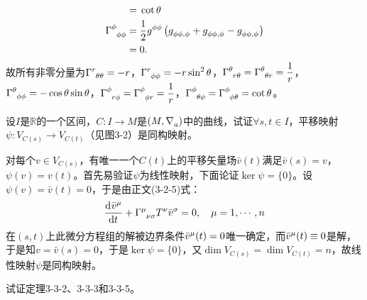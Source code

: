 \begin{xiti}
\begin{jie}
\begin{align*}
		=&\; \cot\theta\\
		\ChristoffelSymbol{\phi}{\phi}{\phi}=&\; \christoffelSymbol{\phi}{\phi}{\phi}{\phi}\\
		=&\; 0.
		\end{align*}
		故所有非零分量为$\displaystyle \ChristoffelSymbol{r}{\theta}{\theta}=-r $，$\displaystyle \ChristoffelSymbol{r}{\phi}{\phi}=-r \sin^2 \theta $，$\displaystyle \ChristoffelSymbol{\theta}{r}{\theta} = \ChristoffelSymbol{\theta}{\theta}{r} = \frac{1}{r} $，$\displaystyle \ChristoffelSymbol{\theta}{\phi}{\phi} = - \cos \theta \sin \theta $，$\displaystyle \ChristoffelSymbol{\phi}{r}{\phi} = \ChristoffelSymbol{\phi}{\phi}{r} = \frac{1}{r} $，$\displaystyle \ChristoffelSymbol{\phi}{\theta}{\phi} = \ChristoffelSymbol{\phi}{\phi}{\theta}=\cot\theta $。
	\end{jie}

	\item 设$I$是$\mathbb{R}$的一个区间，$C\colon I\rightarrow M $是$\left( M,\Nabla{a} \right)$中的曲线，试证$\forall s,t\in I $，平移映射$\psi\colon V_{C(s)}\rightarrow V_{C(t)} $（见图3-2）是同构映射。

	\begin{zm}
		对每个$v\in V_{C(s)}$，有唯一一个$C(t)$上的平移矢量场$\bar{v}(t)$满足$\bar{v}(s)=v$，$\psi(v)=v(t)$。首先易验证$\psi$为线性映射，下面论证$\ker\psi=\{0\}$。设$\psi(v)= \bar{v}(t)=0$，于是由正文(3-2-5)式：
		\begin{displaymath}
		\dvt{\tensor{\bar{v}}{^\mu}} + \ChristoffelSymbol{\mu}{\nu}{\sigma} \tensor{T}{^\nu}\tensor{\bar{v}}{^\sigma}=0 \qc \mu=1,\cdots ,n
		\end{displaymath}
		在$(s,t)$上此微分方程组的解被边界条件$\tensor{\bar{v}}{^\mu}(t)=0 $唯一确定，而$\tensor{\bar{v}}{^\mu}(t)\equiv0 $是解，于是知$v=\bar{v}(s)=0$，于是$\ker \psi=\{0\}$，又$\dim V_{C(s)}=\dim V_{C(t)}=n $，故线性映射$\psi $是同构映射。
	\end{zm}

	\item 试证定理3-3-2、3-3-3和3-3-5。


\end{xiti}
